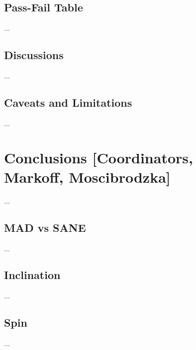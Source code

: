 \documentclass[twocolumn,tighten,dvipsnames,linenumbers]{aastex63}
\begin{document}

\subsection{Pass-Fail Table}
\label{sec:passfail}

...

\subsection{Discussions}
\label{sec:discussions}

...

\subsection{Caveats and Limitations}
\label{sec:caveats}

...

\section{Conclusions
  [Coordinators, Markoff, Moscibrodzka]}
\label{sec:conclusions}

...

\subsection{MAD vs SANE}

...

\subsection{Inclination}

...

\subsection{Spin}

...
\end{document}
